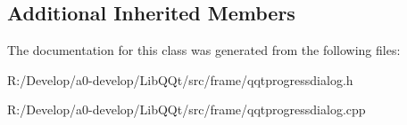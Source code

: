 \subsection*{Additional Inherited Members}


The documentation for this class was generated from the following files\+:\begin{DoxyCompactItemize}
\item 
R\+:/\+Develop/a0-\/develop/\+Lib\+Q\+Qt/src/frame/qqtprogressdialog.\+h\item 
R\+:/\+Develop/a0-\/develop/\+Lib\+Q\+Qt/src/frame/qqtprogressdialog.\+cpp\end{DoxyCompactItemize}

